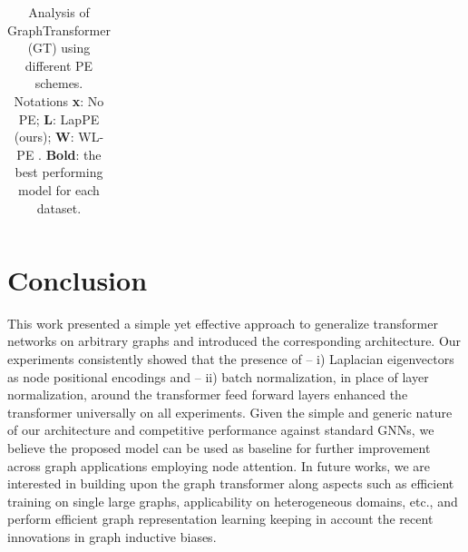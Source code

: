 \documentclass[letterpaper]{article} %
\begin{document}
\begin{table}[t!]
{\begin{tabular}{r|r|c|cccc}
        \bottomrule
        \end{tabular}
    }
    \caption{
    Analysis of GraphTransformer (GT) using different PE schemes. Notations \textbf{x}: No PE; \textbf{L}: LapPE (ours); \textbf{W}: WL-PE \cite{zhang2020graph}.
    \textbf{Bold}: the best performing model for each dataset.
    }
    \label{tab:results_ablation}
\end{table}


\section{Conclusion}
This work presented a simple yet effective approach to generalize transformer networks on arbitrary graphs and introduced the corresponding architecture. Our experiments consistently showed that the presence of -- i) Laplacian eigenvectors as node positional encodings and -- ii) batch normalization, in place of layer normalization, around the transformer feed forward layers enhanced the transformer universally on all experiments.
Given the simple and generic nature of our architecture and competitive performance against standard GNNs, we believe the proposed model can be used as baseline for further improvement across graph applications employing node attention. In future works, we are interested in building upon the graph transformer along aspects such as efficient training on single large graphs, applicability on heterogeneous domains, etc., and perform efficient graph representation learning keeping in account the recent innovations in graph inductive biases.


\end{document}

